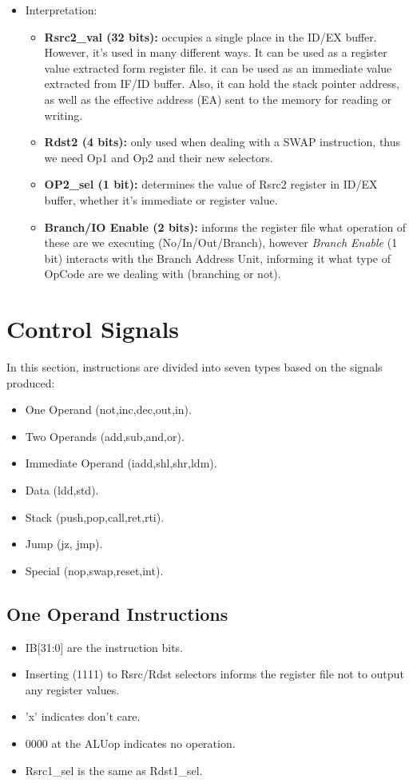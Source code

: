 \documentclass[12pt]{report}
\begin{document}
\begin{itemize}
\begin{itemize}
    \end{itemize}
    
    \item Interpretation:
    \begin{itemize}
        \item \textbf{Rsrc2\_val (32 bits):} occupies a single place in the ID/EX buffer. However, it's used in many different ways. It can be used as a register value extracted form register file. it can be used as an immediate value extracted from IF/ID buffer. Also, it can hold the stack pointer address, as well as the effective address (EA) sent to the memory for reading or writing.
        \item \textbf{Rdst2 (4 bits):} only used when dealing with a SWAP instruction, thus we need Op1 and Op2 and their new selectors.
        \item \textbf{OP2\_sel (1 bit):} determines the value of Rsrc2 register in ID/EX buffer, whether it's immediate or register value.
        \item  \textbf{Branch/IO Enable (2 bits):} informs the register file what operation of these are we executing (No/In/Out/Branch), however \emph{Branch Enable} (1 bit) interacts with the Branch Address Unit, informing it what type of OpCode are we dealing with (branching or not).
    \end{itemize}
\end{itemize}

\section{Control Signals}
In this section, instructions are divided into seven types based on the signals produced:
\begin{itemize}
    \item One Operand (not,inc,dec,out,in).
    \item Two Operands (add,sub,and,or).
    \item Immediate Operand (iadd,shl,shr,ldm).
    \item Data (ldd,std).
    \item Stack (push,pop,call,ret,rti).
    \item Jump (jz, jmp).
    \item Special (nop,swap,reset,int).
\end{itemize}   

\subsection{One Operand Instructions}
\begin{itemize}
    \item IB[31:0] are the instruction bits.
    \item Inserting (1111) to Rsrc/Rdst selectors informs the register file not to output any register values.
    \item 'x' indicates don't care.
    \item 0000 at the ALUop indicates no operation.
    \item Rsrc1\_sel is the same as Rdst1\_sel.
\end{itemize}
\end{document}
